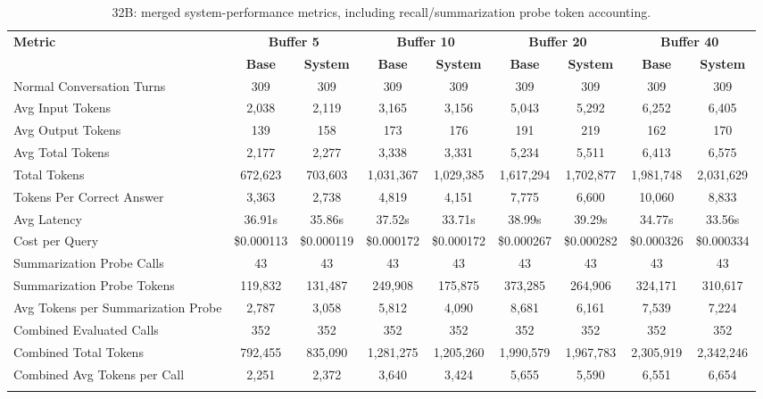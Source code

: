 \documentclass[pdflatex,sn-mathphys-num]{sn-jnl}%
\theoremstyle{thmstyleone}%
\theoremstyle{thmstyletwo}%
\theoremstyle{thmstylethree}%
\begin{document}
\begin{table}[htbp]
\caption{32B: merged system-performance metrics, including recall/summarization probe token accounting.}\label{tab:32b_perf_main}
\centering
\tiny
\setlength{\tabcolsep}{2.2pt}
\begin{adjustbox}{width=\textwidth}
\begin{tabular}{lcccccccc}
\toprule
\textbf{Metric} & \multicolumn{2}{c}{\textbf{Buffer 5}} & \multicolumn{2}{c}{\textbf{Buffer 10}} & \multicolumn{2}{c}{\textbf{Buffer 20}} & \multicolumn{2}{c}{\textbf{Buffer 40}} \\
\cmidrule(lr){2-3}\cmidrule(lr){4-5}\cmidrule(lr){6-7}\cmidrule(lr){8-9}
 & \textbf{Base} & \textbf{System} & \textbf{Base} & \textbf{System} & \textbf{Base} & \textbf{System} & \textbf{Base} & \textbf{System} \\
\midrule
Normal Conversation Turns & 309 & 309 & 309 & 309 & 309 & 309 & 309 & 309 \\
Avg Input Tokens & 2,038 & 2,119 & 3,165 & 3,156 & 5,043 & 5,292 & 6,252 & 6,405 \\
Avg Output Tokens & 139 & 158 & 173 & 176 & 191 & 219 & 162 & 170 \\
Avg Total Tokens & 2,177 & 2,277 & 3,338 & 3,331 & 5,234 & 5,511 & 6,413 & 6,575 \\
Total Tokens & 672,623 & 703,603 & 1,031,367 & 1,029,385 & 1,617,294 & 1,702,877 & 1,981,748 & 2,031,629 \\
Tokens Per Correct Answer & 3,363 & 2,738 & 4,819 & 4,151 & 7,775 & 6,600 & 10,060 & 8,833 \\
Avg Latency & 36.91s & 35.86s & 37.52s & 33.71s & 38.99s & 39.29s & 34.77s & 33.56s \\
Cost per Query & \$0.000113 & \$0.000119 & \$0.000172 & \$0.000172 & \$0.000267 & \$0.000282 & \$0.000326 & \$0.000334 \\
Summarization Probe Calls & 43 & 43 & 43 & 43 & 43 & 43 & 43 & 43 \\
Summarization Probe Tokens & 119,832 & 131,487 & 249,908 & 175,875 & 373,285 & 264,906 & 324,171 & 310,617 \\
Avg Tokens per Summarization Probe & 2,787 & 3,058 & 5,812 & 4,090 & 8,681 & 6,161 & 7,539 & 7,224 \\
Combined Evaluated Calls & 352 & 352 & 352 & 352 & 352 & 352 & 352 & 352 \\
Combined Total Tokens & 792,455 & 835,090 & 1,281,275 & 1,205,260 & 1,990,579 & 1,967,783 & 2,305,919 & 2,342,246 \\
Combined Avg Tokens per Call & 2,251 & 2,372 & 3,640 & 3,424 & 5,655 & 5,590 & 6,551 & 6,654 \\
\botrule
\end{tabular}
\end{adjustbox}
\end{table}
\end{document}
